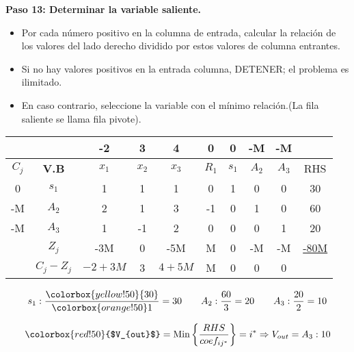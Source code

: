 \documentclass{templateNote}
\begin{document}
\textbf{Paso 13: Determinar la variable saliente.}
\begin{itemize}
    \item Por cada número positivo en la columna de entrada, calcular la relación de los valores del lado derecho dividido por estos valores de columna entrantes.
    \item Si no hay valores positivos en la entrada columna, DETENER; el problema es ilimitado.
    \item En caso contrario, seleccione la variable con el mínimo relación.(La fila saliente se llama fila pivote).
\end{itemize}
\begin{center}
    \begin{tabular}{|c|c|c|c|c|c|c|c|c|c|}
        \hline
        & & -2 & 3 & 4 & 0 & 0 & -M & -M & \\ \hline
        $C_j$ & \textbf{V.B} & $x_1$ & $x_2$ & $x_3$ & $R_1$ & $s_1$ & $A_2$ & $A_3$ & RHS \\ \hline
        0 & $s_1$ & 1 & 1 & \cellcolor{orange!50}1 & 0 & 1 & 0 & 0 & \cellcolor{yellow!50}30 \\ \hline
        -M & $A_2$ & 2 & 1 & 3 & -1 & 0 & 1 & 0 & 60 \\ \hline
        -M & $A_3$ & 1 & -1 & 2 & 0 & 0 & 0 & 1 & 20 \\ \hline
        & $Z_j$ & -3M & 0 & -5M & M & 0 & -M & -M & \underline{-80M} \\ \hline
        & $C_j - Z_j$ & $-2+3M$ & 3 & $4+5M$ & M & 0 & 0 & 0 & \\ \hline
    \end{tabular}
\end{center}
\begin{align*}
    s_1: \frac{\colorbox{yellow!50}{30}}{\colorbox{orange!50}1} = 30 \qquad A_2: \frac{60}{3} = 20 \qquad A_3: \frac{20}{2} = 10
\end{align*}
\begin{center}
    \begin{equation*}
        \colorbox{red!50}{$V_{out}$} = \text{Min} \left\{ \frac{RHS}{coef_{ij^*}} \right\} = i^* \Rightarrow V_{out} = A_3 : 10
    \end{equation*}
\end{center}
\end{document}
